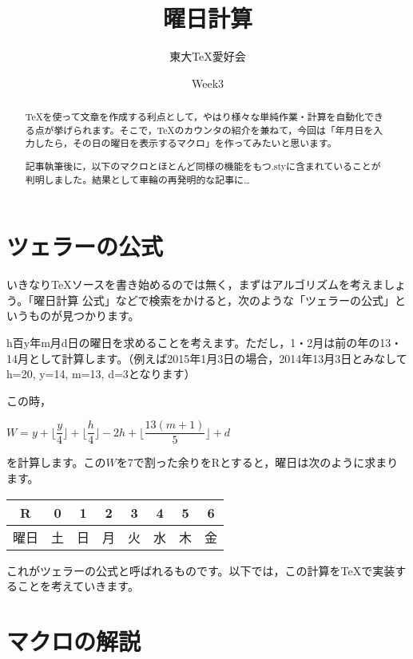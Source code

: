 \documentclass[autodetect-engine,dvipdfmx]{jsarticle}
\title{曜日計算}
\author{東大TeX愛好会}
\date{Week3}
\begin{document}
\maketitle

\begin{abstract}
TeXを使って文章を作成する利点として，やはり様々な単純作業・計算を自動化できる点が挙げられます。そこで，\TeX のカウンタの紹介を兼ねて，今回は「年月日を入力したら，その日の曜日を表示するマクロ」を作ってみたいと思います。

記事執筆後に，以下のマクロとほとんど同様の機能をもつ\verb@{}.styに含まれていることが判明しました。結果として車輪の再発明的な記事に…
\end{abstract}

\part{ツェラーの公式}

いきなり\TeX ソースを書き始めるのでは無く，まずはアルゴリズムを考えましょう。「曜日計算 公式」などで検索をかけると，次のような「ツェラーの公式」というものが見つかります。

h百y年m月d日の曜日を求めることを考えます。ただし，1・2月は前の年の13・14月として計算します。（例えば2015年1月3日の場合，2014年13月3日とみなしてh=20, y=14, m=13, d=3となります）

この時，

\begin{tcolorbox}
$W=y+\lfloor\dfrac{y}{4}\rfloor+\lfloor\dfrac{h}{4}\rfloor-2h+\lfloor\dfrac{13(m+1)}{5}\rfloor+d$
\end{tcolorbox}

を計算します。この$W$を7で割った余りをRとすると，曜日は次のように求まります。

\begin{table}[h]

\centering

\begin{tabular}{|c|c|c|c|c|c|c|c|}
\hline
R&0&1&2&3&4&5&6\\\hline
曜日&土&日&月&火&水&木&金\\\hline
\end{tabular}

\end{table}

これがツェラーの公式と呼ばれるものです。以下では，この計算を\TeX で実装することを考えていきます。

\part{マクロの解説}
\end{document}
